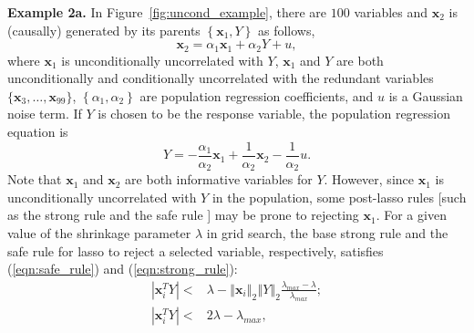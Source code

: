 \documentclass[11pt,review,authoryear]{elsarticle}
\begin{document}
\smallskip
\noindent
\textbf{Example 2a.} In Figure~\ref{fig:uncond_example}, there are $100$ variables and $\mathbf{x}_2$ is (causally) generated by its parents $\left\{ \mathbf{x}_1, Y \right\}$ as follows,
%
\begin{equation}
  \mathbf{x}_2 = \alpha_1 \mathbf{x}_1 + \alpha_2 Y + u,
  \label{eqn:collider_1}
\end{equation}
%
where $\mathbf{x}_1$ is unconditionally uncorrelated with $Y$, $\mathbf{x}_1$ and $Y$ are both unconditionally and conditionally uncorrelated with the redundant variables $\{\mathbf{x}_3, \ldots, \mathbf{x}_{99}\}$, $\left\{\alpha_1, \alpha_2 \right\}$ are population regression coefficients, and $u$ is a Gaussian noise term. If $Y$ is chosen to be the response variable, the population regression equation is
%
\begin{equation}
  Y = -\frac{\alpha_1}{\alpha_2} \mathbf{x}_1 + \frac{1}{\alpha_2} \mathbf{x}_2 - \frac{1}{\alpha_2}u.
  \label{eqn:collider_2}
\end{equation}
%
Note that $\mathbf{x}_1$ and $\mathbf{x}_2$ are both informative variables for $Y$. However, since $\mathbf{x}_1$ is unconditionally uncorrelated with $Y$ in the population, some post-lasso rules [such as the strong rule \citep{tibshirani2012strong} and the safe rule \citep{ghaoui2010safe}] may be prone to rejecting $\mathbf{x}_1$. For a given value of the shrinkage parameter $\lambda$ in grid search, the base strong rule and the safe rule for lasso to reject a selected variable, respectively, satisfies (\ref{eqn:safe_rule}) and (\ref{eqn:strong_rule}):
%
\begin{eqnarray}
  \left\vert \mathbf{x}_i^T Y \right\vert < & \lambda - \left\Vert \mathbf{x}_i \right\Vert_2 \left\Vert Y \right\Vert_2 \frac{\lambda_{max} - \lambda} {\lambda_{max}} ; \label{eqn:safe_rule} \\
  \left\vert \mathbf{x}_i^T Y \right\vert < & 2\lambda - \lambda_{max} , \label{eqn:strong_rule}
  \label{eqn:post_estmation_rule}
\end{eqnarray}
%
\end{document}
